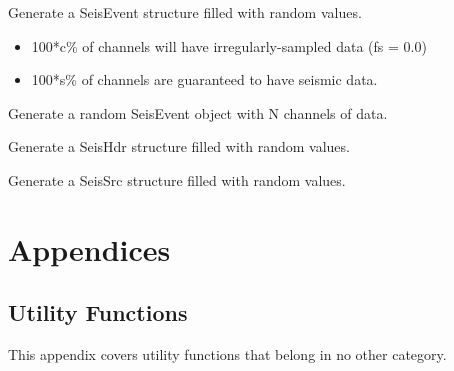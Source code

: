 \documentclass[letterpaper,11pt,english]{sphinxmanual}
\begin{document}
Generate a SeisEvent structure filled with random values.
\begin{itemize}
\item {} 
100*c\% of channels  will have irregularly-sampled data (fs = 0.0)

\item {} 
100*s\% of channels  are guaranteed to have seismic data.

\end{itemize}


\begin{fulllineitems}
\end{fulllineitems}


Generate a random SeisEvent object with N channels of data.

\begin{fulllineitems}
\label{\detokenize{src/Submodules/randseis:randSeisHdr}}
\end{fulllineitems}


Generate a SeisHdr structure filled with random values.

\begin{fulllineitems}
\label{\detokenize{src/Submodules/randseis:randSeisSrc}}
\end{fulllineitems}


Generate a SeisSrc structure filled with random values.


\chapter{Appendices}
\label{\detokenize{index:appendices}}

\section{Utility Functions}
\label{\detokenize{src/Appendices/function_list:utility-functions}}\label{\detokenize{src/Appendices/function_list:function-list}}\label{\detokenize{src/Appendices/function_list::doc}}
This appendix covers utility functions that belong in no other category.
\end{document}
